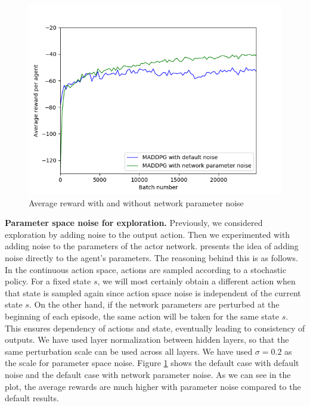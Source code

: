\documentclass{article}
\begin{document}
\begin{figure}
\begin{center}
\includegraphics[scale=0.5]{network_parameter_exploration}
\end{center}
\caption{Average reward with and without network parameter noise}
\label{fig:parameter_noise_exploration}
\end{figure}

\textbf{Parameter space noise for exploration.} Previously, we considered exploration by adding noise to the output action. Then we experimented with adding noise to the parameters of the actor network. \cite{plappert2017parameter} presents the idea of adding noise directly to the agent's parameters. The reasoning behind this is as follows. In the continuous action space, actions are sampled according to a stochastic policy. For a fixed state $s$, we will most certainly obtain a different action when that state is sampled again since action space noise is independent of the current state $s$. On the other hand, if the network parameters are perturbed at the beginning of each episode, the same action will be taken for the same state $s$. This ensures dependency of actions and state, eventually leading to consistency of outputs. We have used layer normalization between hidden layers, so that the same perturbation scale can be used across all layers. We have used $\sigma = 0.2$ as the scale for parameter space noise. Figure \ref{fig:parameter_noise_exploration} shows the default case with default noise and the default case with network parameter noise. As we can see in the plot, the average rewards are much higher with parameter noise compared to the default results.  
\end{document}

